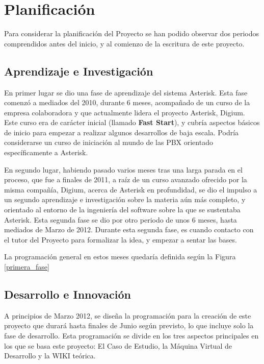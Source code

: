 \section{Planificación}

Para considerar la planificación del Proyecto se han podido observar dos periodos comprendidos antes del inicio, y al comienzo de la escritura de este proyecto.

\subsection{Aprendizaje e Investigación}

En primer lugar se dio una fase de aprendizaje del sistema Asterisk. Esta fase comenzó a mediados del 2010, durante 6 meses, acompañado de un curso de la empresa colaboradora y que actualmente lidera el proyecto Asterisk, Digium. Este curso era de carácter inicial (llamado \textbf{Fast Start}), y cubría aspectos básicos de inicio para empezar a realizar algunos desarrollos de baja escala. Podría considerarse un curso de iniciación al mundo de las PBX orientado específicamente a Asterisk. 

En segundo lugar, habiendo pasado varios meses tras una larga parada en el proceso, que fue a finales de 2011, a raíz de un curso avanzado ofrecido por la misma compañía, Digium, acerca de Asterisk en profundidad, se dio el impulso a un segundo aprendizaje e investigación sobre la materia aún más completo, y orientado al entorno de la ingeniería del software sobre la que se sustentaba Asterisk. Esta segunda fase se dio por otro periodo de unos 6 meses, hasta mediados de Marzo de 2012. Durante esta segunda fase, es cuando contacto con el tutor del Proyecto para formalizar la idea, y empezar a sentar las bases.

La programación general en estos meses quedaría definida según la Figura \ref{primera_fase}


\subsection{Desarrollo e Innovación}

A principios de Marzo 2012, se diseña la programación para la creación de este proyecto que durará hasta finales de Junio según previsto, lo que incluye solo la fase de desarrollo. Esta programación se divide en los tres aspectos principales en los que se basa este proyecto: El Caso de Estudio, la Máquina Virtual de Desarrollo y la WIKI teórica.

